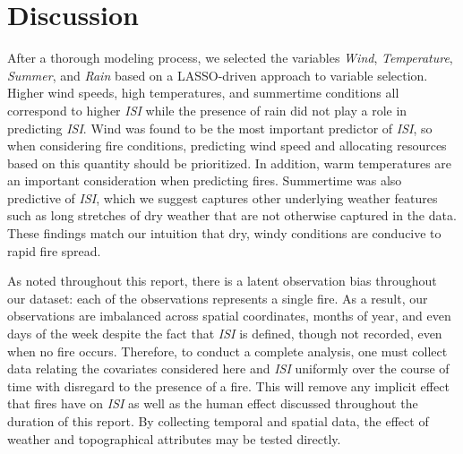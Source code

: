 \documentclass{article}
\begin{document}
\section{Discussion}\label{Discussion}



After a thorough modeling process, we selected the variables \textit{Wind}, \textit{Temperature}, \textit{Summer}, and \textit{Rain} based on a LASSO-driven approach to variable selection. Higher wind speeds, high temperatures, and summertime conditions all correspond to higher \textit{ISI} while the presence of rain did not play a role in predicting \textit{ISI}. 
Wind was found to be the most important predictor of \textit{ISI}, so when considering fire conditions, predicting wind speed and allocating resources based on this quantity should be prioritized. In addition, warm temperatures are an important consideration when predicting fires. Summertime was also predictive of \textit{ISI}, which we suggest captures other underlying weather features such as long stretches of dry weather that are not otherwise captured in the data. These findings match our intuition that dry, windy conditions are conducive to rapid fire spread. 

As noted throughout this report, there is a latent observation bias throughout our dataset: each of the observations represents a single fire. As a result, our observations are imbalanced across spatial coordinates, months of year, and even days of the week despite the fact that \textit{ISI} is defined, though not recorded, even when no fire occurs. Therefore, to conduct a complete analysis, one must collect data relating the covariates considered here and \textit{ISI} uniformly over the course of time with disregard to the presence of a fire. This will remove any implicit effect that fires have on \textit{ISI} as well as the human effect discussed throughout the duration of this report. By collecting temporal and spatial data, the effect of weather and topographical attributes may be tested directly.  
\end{document}
